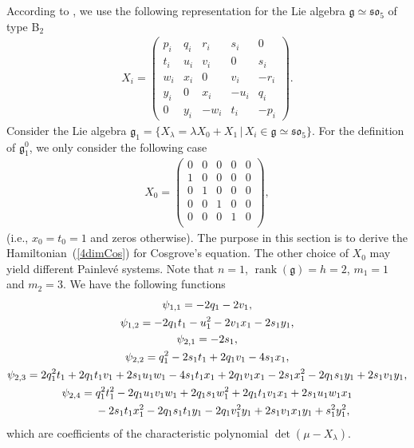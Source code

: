 \documentclass[10pt,a4paper]{amsart}
\numberwithin{equation}{section}
\begin{document}
According to \cite{DS}, we use the following representation for the Lie algebra $\mathfrak{g} \simeq \mathfrak{so}_5$ of type B$_2$
\begin{gather*}
X_i = \left(
\begin{matrix}
p_i & q_i & r_i & s_i & 0 \\
t_i & u_i & v_i & 0 & s_i \\
w_i & x_i & 0 & v_i & -r_i \\
y_i & 0 & x_i & -u_i & q_i \\
0 & y_i & -w_i & t_i & -p_i
\end{matrix}
\right).
\end{gather*}
Consider the Lie algebra $\mathfrak{g}_1 = \{ X_\lambda = \lambda X_0 + X_1 \, | \, X_i\in \mathfrak{g} \simeq \mathfrak{so}_5\}$. For the def\/inition of $\mathfrak{g}^0_1$, we only consider the following case
\begin{gather*}
X_0 = \left(
\begin{matrix}
0 & 0 & 0 & 0 & 0 \\
1 & 0 & 0 & 0 & 0 \\
0 & 1 & 0 & 0 & 0 \\
0 & 0 & 1 & 0 & 0 \\
0 & 0 & 0 & 1 & 0 \\
\end{matrix}
\right),
\end{gather*} (i.e., $x_0=t_0=1$ and zeros otherwise). The purpose in this section is to derive the Hamiltonian~(\ref{4dimCos}) for Cosgrove's equation. The other choice of $X_0$ may yield dif\/ferent Painlev\'{e} systems. Note that $n=1$, $\operatorname{rank}(\mathfrak{g}) = h=2$, $m_1 = 1$ and $m_2 = 3$.
We have the following functions
\begin{gather*}
\psi_{1,1} = -2q_1 - 2v_1, \\
\psi_{1,2} = -2q_1t_1 - u_1^2 - 2v_1x_1 - 2s_1y_1, \\
\psi_{2,1} = -2s_1, \\
\psi_{2,2} = q_1^2 - 2s_1t_1 + 2q_1v_1 - 4s_1x_1, \\
\psi_{2,3} = 2q_1^2t_1 + 2q_1t_1v_1 + 2s_1u_1w_1 - 4s_1t_1x_1 + 2q_1v_1x_1
 -2s_1x_1^2 - 2q_1s_1y_1 + 2s_1v_1y_1, \\
\psi_{2,4} = q_1^2t_1^2 - 2q_1u_1v_1w_1 + 2q_1s_1w_1^2 + 2q_1t_1v_1x_1 + 2s_1u_1w_1x_1 \\
\hphantom{\psi_{2,4} =}{} -2s_1t_1x_1^2 - 2q_1s_1t_1y_1 - 2q_1v_1^2y_1 + 2s_1v_1x_1y_1 + s_1^2y_1^2,
\end{gather*}
which are coef\/f\/icients of the characteristic polynomial $\det (\mu - X_\lambda )$.
\end{document}
